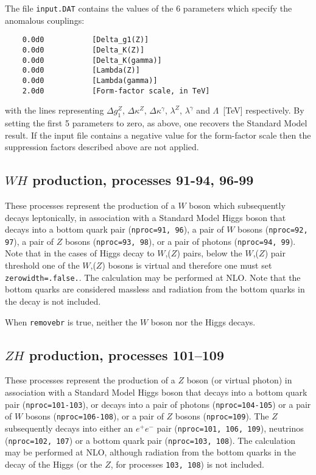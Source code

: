 \documentclass{article}
\begin{document}
The file {\tt input.DAT} contains the values of the $6$ parameters
which specify the anomalous couplings:
\begin{verbatim}
    0.0d0           [Delta_g1(Z)]
    0.0d0           [Delta_K(Z)]
    0.0d0           [Delta_K(gamma)]
    0.0d0           [Lambda(Z)]
    0.0d0           [Lambda(gamma)]
    2.0d0           [Form-factor scale, in TeV]
\end{verbatim}
with the lines representing $\Delta g_1^Z$, $\Delta \kappa^Z$,
$\Delta \kappa^\gamma$, $\lambda^Z$, $\lambda^\gamma$ and
$\Lambda$~[TeV] respectively. By setting the first 5 parameters to zero,
as above, one recovers the Standard Model result.
If the input file contains a negative value for the form-factor scale
then the suppression factors described above are not applied.

\subsection{$WH$ production, processes 91-94, 96-99}
\label{subsec:wh}

These processes represent the production of a $W$ boson which subsequently
decays leptonically, in association with a Standard Model Higgs boson that
decays into a bottom quark pair ({\tt nproc=91, 96}), 
a pair of $W$ bosons ({\tt nproc=92, 97}), 
a pair of $Z$ bosons ({\tt nproc=93, 98}), or a pair of photons ({\tt nproc=94, 99}).  
Note that in the cases of Higgs decay to $W$,($Z$) pairs, 
below the $W$,($Z$) pair threshold
one of the $W$,($Z$) bosons is virtual 
and therefore one must set {\tt zerowidth=.false.}.
The calculation may be performed at NLO.
Note that the bottom quarks are considered massless and radiation from the
bottom quarks in the decay is not included.

When {\tt removebr} is true, neither the $W$ boson nor the Higgs decays.

\subsection{$ZH$ production, processes 101--109}
\label{subsec:zh}

These processes represent the production of a $Z$ boson (or virtual photon)
in association with a Standard Model Higgs boson that
decays into a bottom quark pair ({\tt nproc=101-103}),
or decays into a pair of photons ({\tt nproc=104-105}) 
or a pair of $W$ bosons ({\tt nproc=106-108}),
or a pair of $Z$ bosons ({\tt nproc=109}). 
The $Z$ subsequently decays into 
either an $e^+ e^-$ pair ({\tt nproc=101, 106, 109}), neutrinos ({\tt nproc=102, 107})
or a bottom quark pair ({\tt nproc=103, 108}).
The calculation may be performed at NLO, although radiation from the
bottom quarks in the decay of the Higgs (or the $Z$, for processes
{\tt 103, 108}) is not included.
\end{document}
